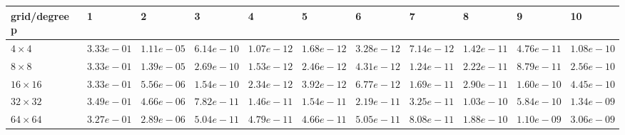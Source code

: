 \begin{tabular}{lllllllllll}
\hline
 grid/degree p   & 1          & 2          & 3          & 4          & 5          & 6          & 7          & 8          & 9          & 10         \\
\hline
 $4 \times 4$    & $3.33e-01$ & $1.11e-05$ & $6.14e-10$ & $1.07e-12$ & $1.68e-12$ & $3.28e-12$ & $7.14e-12$ & $1.42e-11$ & $4.76e-11$ & $1.08e-10$ \\
 $8 \times 8$    & $3.33e-01$ & $1.39e-05$ & $2.69e-10$ & $1.53e-12$ & $2.46e-12$ & $4.31e-12$ & $1.24e-11$ & $2.22e-11$ & $8.79e-11$ & $2.56e-10$ \\
 $16 \times 16$  & $3.33e-01$ & $5.56e-06$ & $1.54e-10$ & $2.34e-12$ & $3.92e-12$ & $6.77e-12$ & $1.69e-11$ & $2.90e-11$ & $1.60e-10$ & $4.45e-10$ \\
 $32 \times 32$  & $3.49e-01$ & $4.66e-06$ & $7.82e-11$ & $1.46e-11$ & $1.54e-11$ & $2.19e-11$ & $3.25e-11$ & $1.03e-10$ & $5.84e-10$ & $1.34e-09$ \\
 $64 \times 64$  & $3.27e-01$ & $2.89e-06$ & $5.04e-11$ & $4.79e-11$ & $4.66e-11$ & $5.05e-11$ & $8.08e-11$ & $1.88e-10$ & $1.10e-09$ & $3.06e-09$ \\
\hline
\end{tabular}